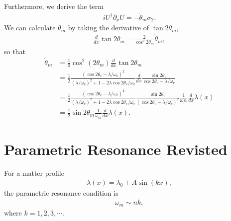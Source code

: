 \documentclass[letterpaper,12pt,english]{sphinxmanual}
\begin{document}
Furthermore, we derive the term
\begin{equation*}
\begin{split}i U^\dagger \partial_x U = - \dot\theta_m \sigma_2.\end{split}
\end{equation*}
We can calculate \(\dot\theta_m\) by taking the derivative of \(\tan 2\theta_m\),
\begin{equation*}
\begin{split}\frac{d}{dx} \tan 2\theta_m = \frac{2}{\cos^2 2\theta_m} \dot\theta_m,\end{split}
\end{equation*}
so that
\begin{equation*}
\begin{split}\dot\theta_m &= \frac{1}{2} \cos^2 (2\theta_m) \frac{d}{dx} \tan 2\theta_m \\
& = \frac{1}{2} \frac{(\cos 2\theta_v - \lambda/\omega_v)^2}{ (\lambda/\omega_v)^2 + 1 - 2\lambda \cos 2\theta_v /\omega_v } \frac{d}{dx} \frac{\sin 2\theta_v}{\cos 2\theta_v - \lambda/\omega_v} \\
& = \frac{1}{2} \frac{(\cos 2\theta_v - \lambda/\omega_v)^2}{ (\lambda/\omega_v)^2 + 1 - 2\lambda \cos 2\theta_v /\omega_v }  \frac{\sin 2\theta_v}{(\cos 2\theta_v - \lambda/\omega_v)^2} \frac{1}{\omega)v} \frac{d}{dx} \lambda(x) \\
& = \frac{1}{2} \sin 2\theta_m \frac{1}{\omega_m} \frac{d}{dx} \lambda(x).\end{split}
\end{equation*}

\section{Parametric Resonance Revisted}
\label{\detokenize{matter-stimulated/parametric-resonance-revisted:parametric-resonance-revisted}}\label{\detokenize{matter-stimulated/parametric-resonance-revisted::doc}}
For a matter profile
\label{\detokenize{matter-stimulated/parametric-resonance-revisted:equation-parametric-resonance-matter-profile-single-frequency}}\begin{equation}\label{equation:matter-stimulated/parametric-resonance-revisted:parametric-resonance-matter-profile-single-frequency}
\begin{split}\lambda(x) = \lambda_0 + A\sin( k x),\end{split}
\end{equation}
the parametric resonance condition is \label{\detokenize{matter-stimulated/parametric-resonance-revisted:id1}}{\hyperref[\detokenize{matter-stimulated/parametric-resonance-revisted:krastev1989}]{\sphinxcrossref{{[}Krastev1989{]}}}}
\begin{equation*}
\begin{split}\omega_m \sim n k,\end{split}
\end{equation*}
where \(k=1,2,3,\cdots\).
\end{document}
